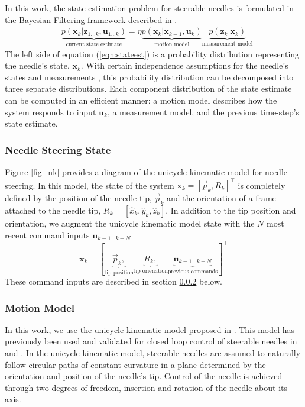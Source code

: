 \documentclass[journal,transmag]{IEEEtran}
\newcommand{\bvar}[2]{\mathbf{#1}_{#2}}
\newcommand{\stateest}[1][k]{p(\mathbf{x}_{#1}|\mathbf{z}_{1...#1},\mathbf{u}_{1...#1})}
\newcommand{\meas}[1][k]{p(\mathbf{z}_{#1}|\mathbf{x}_{#1})}
\newcommand{\motion}[1][k]{p(\mathbf{x}_{#1}|\mathbf{x}_{#1-1},\mathbf{u}_{#1})}
\begin{document}
In this work, the state estimation problem for steerable needles is formulated in the Bayesian Filtering framework described in \cite{Thrun:2005}.
\begin{align}  \label{eqn:stateest}
&\underbrace{\stateest}_{\text{current state estimate}} = \eta \underbrace{\motion}_{\text{motion model}} \underbrace{\meas}_{\text{measurement model}}
\end{align}
The left side of equation (\ref{eqn:stateest}) is a probability distribution representing the needle's state, $\bvar{x}{k}$.  With certain independence assumptions for the needle's states and measurements \cite{Thrun:2005}, this probability distribution can be decomposed into three separate distributions. Each component distribution of the state estimate can be computed in an efficient manner:  a motion model describes how the system responds to input $\bvar{u}{k}$, a measurement model, and the previous time-step's state estimate.


\subsubsection{Needle Steering State}
Figure \ref{fig_nk} provides a diagram of the unicycle kinematic model for needle steering.  In this model, the state of the system $\bvar{x}{k} =  \left[\vec{p}_k, R_k\right]^\top$ is completely defined by the position of the needle tip, $\vec{p}_k$ and the orientation of a frame attached to the needle tip, $R_k = \left[\hat{x}_k,\hat{y}_k,\hat{z}_k\right]$.  In addition to the tip position and orientation,  we augment the unicycle kinematic model state with the $N$ most recent command inputs $\bvar{u}{k-1...k-N}$
\begin{equation*}
\bvar{x}{k} =  \left[\underbrace{\vec{p}_k,}_{\text{tip position}} \underbrace{R_k,}_{\text{tip orienation}} \underbrace{\bvar{u}{k-1...k-N}}_{\text{previous commands}}\right]^\top
\end{equation*}
These command inputs are described in section \ref{subsec:unicycle} below.


\subsubsection{Motion Model} \label{subsec:unicycle}
In this work, we use the unicycle kinematic model proposed in \cite{Park2005}.  This model has previously been used and validated for closed loop control of steerable needles in \cite{Majewicz2013} and \cite{adebar2014recursive}.  In the unicycle kinematic model, steerable needles are assumed to naturally follow circular paths of constant curvature in a plane determined by the orientation and position of the needle's tip.  Control of the needle is achieved through two degrees of freedom, insertion and rotation of the needle about its axis.
\end{document}
